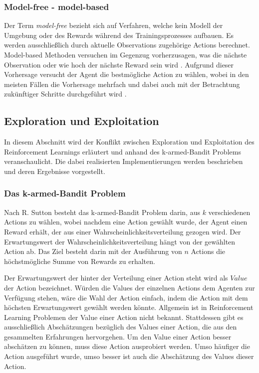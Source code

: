 \documentclass[11pt]{scrartcl}
\begin{document}
\subsubsection{Model-free - model-based}
Der Term \textit{model-free} bezieht sich auf Verfahren, welche kein Modell der Umgebung oder des Rewards
während des Trainingsprozesses aufbauen. Es werden ausschließlich durch aktuelle Observations
zugehörige Actions berechnet. Model-based Methoden versuchen im Gegenzug vorherzusagen, was 
die nächste Observation oder wie hoch der nächste Reward sein wird \cite[~S.NA]{L2018}. Aufgrund dieser
Vorhersage versucht der Agent die bestmögliche Action zu wählen, wobei in den meisten
Fällen die Vorhersage mehrfach und dabei auch mit der Betrachtung zukünftiger Schritte durchgeführt
wird \cite[~S.NA]{L2018}.


\subsection{Exploration und Exploitation}
In diesem Abschnitt wird der Konflikt zwischen Exploration und Exploitation des
Reinforcement Learnings erläutert und anhand des k-armed-Bandit Problems veranschaulicht.
Die dabei realisierten Implementierungen werden beschrieben und deren Ergebnisse
vorgestellt.


\subsubsection{Das k-armed-Bandit Problem}
Nach R. Sutton \cite[~S. 26]{SB1998} besteht das k-armed-Bandit Problem darin, aus $k$
verschiedenen Actions zu wählen, wobei nachdem eine Action gewählt wurde, der Agent einen
Reward erhält, der aus einer Wahrscheinlichkeitsverteilung gezogen wird. Der
Erwartungswert der Wahrscheinlichkeitsverteilung hängt von der gewählten Action ab. Das
Ziel besteht darin mit der Ausführung von $n$ Actions die höchstmögliche Summe von Rewards
zu erhalten.

Der Erwartungswert der hinter der Verteilung einer Action steht wird als $Value$ der Action
bezeichnet. Würden die Values der einzelnen Actions dem Agenten zur Verfügung stehen, wäre die 
Wahl der Action einfach, indem die Action mit dem höchsten Erwartungswert gewählt werden 
könnte. Allgemein ist in Reinforcement Learning Problemen der Value einer Action nicht bekannt.
Stattdessen gibt es ausschließlich Abschätzungen bezüglich des Values einer Action, die aus den
gesammelten Erfahrungen hervorgehen. Um den Value einer Action besser abschätzen zu können,
muss diese Action ausprobiert werden. Umso häufiger die Action ausgeführt wurde, umso besser
ist auch die Abschätzung des Values dieser Action.
\end{document}
